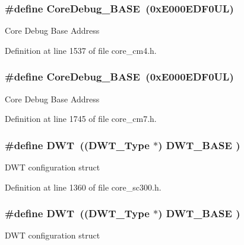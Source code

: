 \subsubsection[{\texorpdfstring{Core\+Debug\+\_\+\+B\+A\+SE}{CoreDebug_BASE}}]{\setlength{\rightskip}{0pt plus 5cm}\#define Core\+Debug\+\_\+\+B\+A\+SE~(0x\+E000\+E\+D\+F0\+U\+L)}\hypertarget{group___c_m_s_i_s__core__base_ga680604dbcda9e9b31a1639fcffe5230b}{}\label{group___c_m_s_i_s__core__base_ga680604dbcda9e9b31a1639fcffe5230b}
Core Debug Base Address 

Definition at line 1537 of file core\+\_\+cm4.\+h.

\subsubsection[{\texorpdfstring{Core\+Debug\+\_\+\+B\+A\+SE}{CoreDebug_BASE}}]{\setlength{\rightskip}{0pt plus 5cm}\#define Core\+Debug\+\_\+\+B\+A\+SE~(0x\+E000\+E\+D\+F0\+U\+L)}\hypertarget{group___c_m_s_i_s__core__base_ga680604dbcda9e9b31a1639fcffe5230b}{}\label{group___c_m_s_i_s__core__base_ga680604dbcda9e9b31a1639fcffe5230b}
Core Debug Base Address 

Definition at line 1745 of file core\+\_\+cm7.\+h.

\subsubsection[{\texorpdfstring{D\+WT}{DWT}}]{\setlength{\rightskip}{0pt plus 5cm}\#define D\+WT~(({\bf D\+W\+T\+\_\+\+Type}       $\ast$)     {\bf D\+W\+T\+\_\+\+B\+A\+SE}      )}\hypertarget{group___c_m_s_i_s__core__base_gabbe5a060185e1d5afa3f85b14e10a6ce}{}\label{group___c_m_s_i_s__core__base_gabbe5a060185e1d5afa3f85b14e10a6ce}
D\+WT configuration struct 

Definition at line 1360 of file core\+\_\+sc300.\+h.

\subsubsection[{\texorpdfstring{D\+WT}{DWT}}]{\setlength{\rightskip}{0pt plus 5cm}\#define D\+WT~(({\bf D\+W\+T\+\_\+\+Type}       $\ast$)     {\bf D\+W\+T\+\_\+\+B\+A\+SE}      )}\hypertarget{group___c_m_s_i_s__core__base_gabbe5a060185e1d5afa3f85b14e10a6ce}{}\label{group___c_m_s_i_s__core__base_gabbe5a060185e1d5afa3f85b14e10a6ce}
D\+WT configuration struct 

